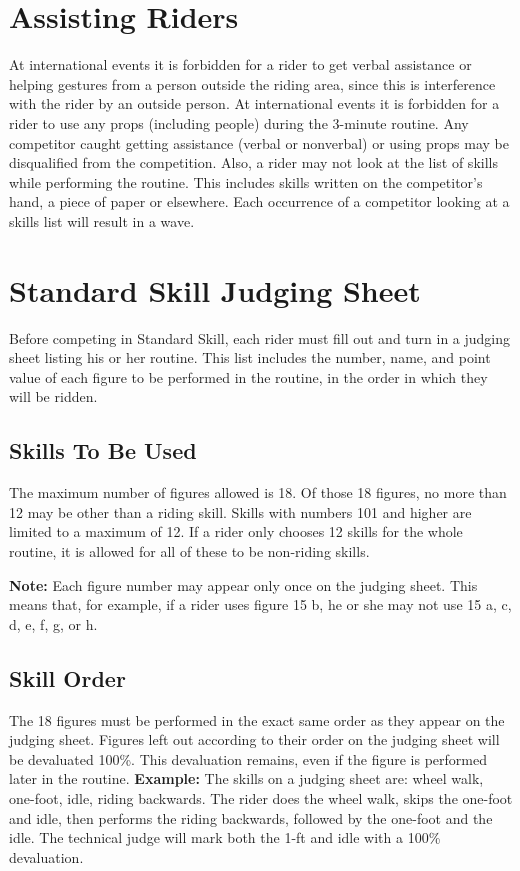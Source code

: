 \section{Assisting Riders}
At international events it is forbidden for a rider to get verbal assistance or helping gestures from a person outside the riding area, since this is interference with the rider by an outside person.
At international events it is forbidden for a rider to use any props (including people) during the 3-minute routine.
Any competitor caught getting assistance (verbal or nonverbal) or using props may be disqualified from the competition.
Also, a rider may not look at the list of skills while performing the routine.
This includes skills written on the competitor's hand, a piece of paper or elsewhere.
Each occurrence of a competitor looking at a skills list will result in a wave.

\section{Standard Skill Judging Sheet}
Before competing in Standard Skill, each rider must fill out and turn in a judging sheet listing his or her routine.
This list includes the number, name, and point value of each figure to be performed in the routine, in the order in which they will be ridden.

\subsection{Skills To Be Used}
The maximum number of figures allowed is 18.
Of those 18 figures, no more than 12 may be other than a riding skill.
Skills with numbers 101 and higher are limited to a maximum of 12.
If a rider only chooses 12 skills for the whole routine, it is allowed for all of these to be non-riding skills.

\textbf{Note:} Each figure number may appear only once on the judging sheet.
This means that, for example, if a rider uses figure 15 b, he or she may not use 15 a, c, d, e, f, g, or h.

\subsection{Skill Order}
The 18 figures must be performed in the exact same order as they appear on the judging sheet.
Figures left out according to their order on the judging sheet will be devaluated 100\%.
This devaluation remains, even if the figure is performed later in the routine.
\textbf{Example:} The skills on a judging sheet are: wheel walk, one-foot, idle, riding backwards.
The rider does the wheel walk, skips the one-foot and idle, then performs the riding backwards, followed by the one-foot and the idle.
The technical judge will mark both the 1-ft and idle with a 100\% devaluation.

